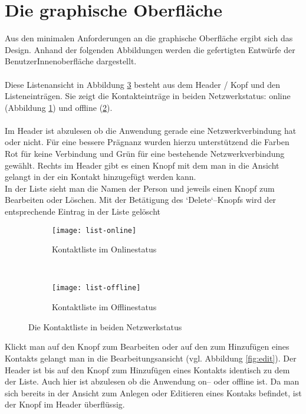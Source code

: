 \section{Die graphische Oberfläche}
Aus den minimalen Anforderungen an die graphische Oberfläche ergibt sich das Design. Anhand der folgenden Abbildungen werden die gefertigten Entwürfe der BenutzerInnenoberfläche dargestellt.\\\\
Diese Listenansicht in Abbildung \ref{fig:list} besteht aus dem Header / Kopf und den Listeneinträgen. Sie zeigt die Kontakteinträge in beiden Netzwerkstatus: online (Abbildung \ref{fig:list-online}) und offline (\ref{fig:list-offline}).\\\\
Im Header ist abzulesen ob die Anwendung gerade eine Netzwerkverbindung hat oder nicht. Für eine bessere Prägnanz wurden hierzu unterstützend die Farben Rot für keine Verbindung und Grün für eine bestehende Netzwerkverbindung gewählt. Rechts im Header gibt es einen Knopf mit dem man in die Ansicht gelangt in der ein Kontakt hinzugefügt werden kann.\\
In der Liste sieht man die Namen der Person und jeweils einen Knopf zum Bearbeiten oder Löschen. Mit der Betätigung des `Delete`--Knopfs wird der entsprechende Eintrag in der Liste gelöscht
\begin{figure}[H]
  \centering
  \begin{subfigure}[t]{0.49\textwidth}
          \texttt{[image: list-online]}
          \caption{Kontaktliste im Onlinestatus}
          \label{fig:list-online}
  \end{subfigure}
  ~ 
  \begin{subfigure}[t]{0.49\textwidth}
          \texttt{[image: list-offline]}
          \caption{Kontaktliste im Offlinestatus}
          \label{fig:list-offline}
  \end{subfigure}
  \grayRule
  \caption{Die Kontaktliste in beiden Netzwerkstatus}
  \label{fig:list}
\end{figure}
Klickt man auf den Knopf zum Bearbeiten oder auf den zum Hinzufügen eines Kontakts gelangt man in die Bearbeitungsansicht (vgl. Abbildung \ref{fig:edit}). Der Header ist bis auf den Knopf zum Hinzufügen eines Kontakts identisch zu dem der Liste. Auch hier ist abzulesen ob die Anwendung on-- oder offline ist. Da man sich bereits in der Ansicht zum Anlegen oder Editieren eines Kontaks befindet, ist der Knopf im Header überflüssig.\\
